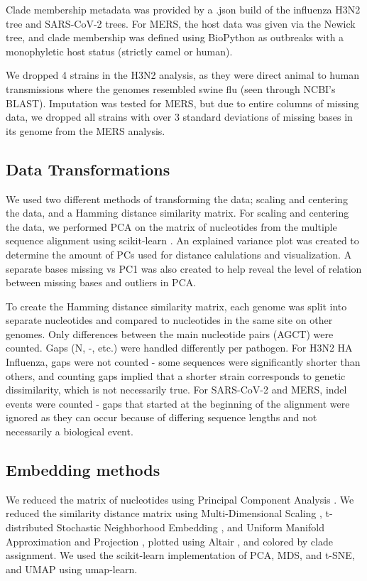\documentclass[10pt,letterpaper]{article}
\begin{document}
Clade membership metadata was provided by a .json build of the influenza H3N2 tree and SARS-CoV-2 trees.
For MERS, the host data was given via the Newick tree, and clade membership was defined using BioPython as outbreaks with a monophyletic host status (strictly camel or human).

We dropped 4 strains in the H3N2 analysis, as they were direct animal to human transmissions where the genomes resembled swine flu (seen through NCBI's BLAST).
Imputation was tested for MERS, but due to entire columns of missing data, we dropped all strains with over 3 standard deviations of missing bases in its genome from the MERS analysis.

\subsection*{Data Transformations}

We used two different methods of transforming the data; scaling and centering the data, and a Hamming distance similarity matrix.
For scaling and centering the data, we performed PCA on the matrix of nucleotides from the multiple sequence alignment using scikit-learn \cite{jolliffe_cadima_2016}.
An explained variance plot was created to determine the amount of PCs used for distance calulations and visualization.
A separate bases missing vs PC1 was also created to help reveal the level of relation between missing bases and outliers in PCA.

To create the Hamming distance similarity matrix, each genome was split into separate nucleotides and compared to nucleotides in the same site on other genomes.
Only differences between the main nucleotide pairs (AGCT) were counted.
Gaps (N, -, etc.) were handled differently per pathogen.
For H3N2 HA Influenza, gaps were not counted - some sequences were significantly shorter than others, and counting gaps implied that a shorter strain corresponds to genetic dissimilarity, which is not necessarily true.
For SARS-CoV-2 and MERS, indel events were counted - gaps that started at the beginning of the alignment were ignored as they can occur because of differing sequence lengths and not necessarily a biological event.

\subsection*{Embedding methods}
We reduced the matrix of nucleotides using Principal Component Analysis \cite{jolliffe_cadima_2016}.
We reduced the similarity distance matrix using Multi-Dimensional Scaling \cite{hout_papesh_goldinger_2012}, t-distributed Stochastic Neighborhood Embedding \cite{maaten2008visualizing}, and Uniform Manifold Approximation and Projection \cite{lel2018umap}, plotted using Altair \cite{VanderPlas2018}, and colored by clade assignment.
We used the scikit-learn implementation of PCA, MDS, and t-SNE, and UMAP using umap-learn.
\end{document}
